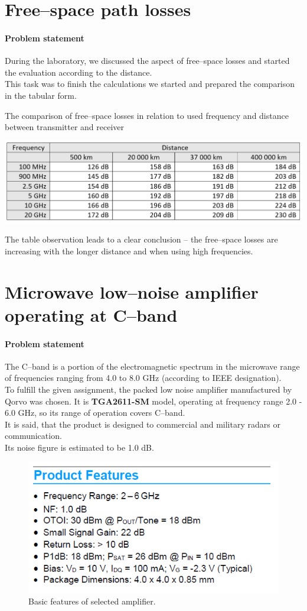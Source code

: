 \documentclass[eng,printmode]{mgr}
\begin{document}
\chapter{Free--space path losses}
\subsubsection{Problem statement}
During the laboratory, we discussed the aspect of free--space losses and started the evaluation according to the distance.\\
This task was to finish the calculations we started and prepared the comparison in the tabular form.

\begin{table}[h]
	\centering
	\caption{The comparison of free--space losses in relation to used frequency and distance between transmitter and receiver}
	\includegraphics[width=0.9\linewidth]{freespace}
	\label{fig:freespace}
\end{table}
\noindent
The table observation leads to a clear conclusion -- the free--space losses are increasing with the longer distance and when using high frequencies.
\newpage
\chapter{Microwave low--noise amplifier operating at C--band}
\subsubsection{Problem statement}
The C--band is a portion of the electromagnetic spectrum in the microwave range of frequencies ranging from 4.0 to 8.0 GHz (according to IEEE designation).\\
To fulfill the given assignment, the packed low noise amplifier manufactured by Qorvo was chosen. It is \textbf{TGA2611-SM} model, operating at frequency range 2.0 - 6.0 GHz, so its range of operation covers C--band.
\\
It is said, that the product is designed to commercial and military radars or communication.\\
Its noise figure is estimated to be 1.0 dB.
\begin{figure}[h]
	\centering
	\includegraphics[width=0.3\linewidth]{chip}
	\caption{Basic features of selected amplifier.}
	\label{fig:chip}
\end{figure}
\end{document}
